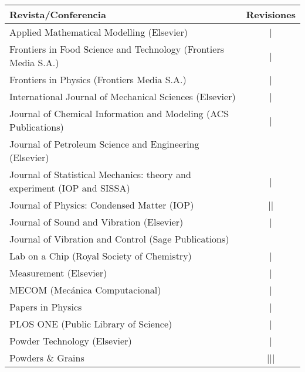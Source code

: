 \begin{center}
	\begin{tabular}{l c}
		\toprule
		\textbf{Revista/Conferencia}                                            & R\textbf{evisiones} \\
		\midrule
		Applied Mathematical Modelling (Elsevier)                               & |                   \\
		Frontiers in Food Science and Technology (Frontiers Media S.A.)         & |                   \\
		Frontiers in Physics (Frontiers Media S.A.)                             & |                   \\
		International Journal of Mechanical Sciences (Elsevier)                 & |                   \\
		Journal of Chemical Information and Modeling (ACS Publications)         & |                   \\
		Journal of Petroleum Science and Engineering (Elsevier)                 & \cancel{||||}       \\
		Journal of Statistical Mechanics: theory and experiment (IOP and SISSA) & |                   \\
		Journal of Physics: Condensed Matter (IOP)                              & ||                  \\
		Journal of Sound and Vibration (Elsevier)                               & \cancel{||||} |     \\
		Journal of Vibration and Control (Sage Publications)                    & \cancel{||||}       \\
		Lab on a Chip (Royal Society of Chemistry)                              & |                   \\
		Measurement (Elsevier)                                                  & |                   \\
		MECOM (Mecánica Computacional)                                          & |                   \\
		Papers in Physics                                                       & |                   \\
		PLOS ONE (Public Library of Science)                                    & |                   \\
		Powder Technology (Elsevier)                                            & |                   \\
		Powders \& Grains                                                       & |||                 \\

\end{tabular}
\end{center}
